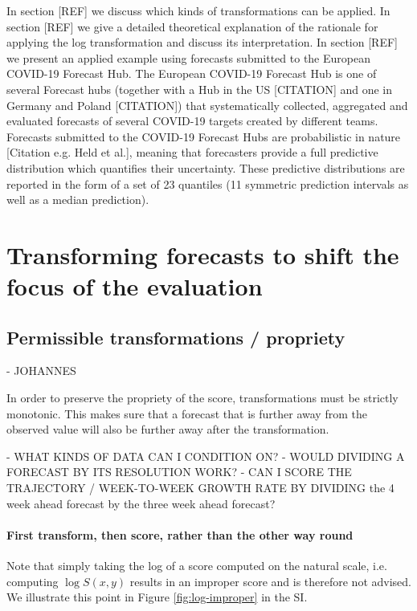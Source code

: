 \documentclass{article}
\begin{document}
In section [REF] we discuss which kinds of transformations can be applied. In section [REF] we give a detailed theoretical explanation of the rationale for applying the log transformation and discuss its interpretation. In section [REF] we present an applied example using forecasts submitted to the European COVID-19 Forecast Hub. The European COVID-19 Forecast Hub is one of several Forecast hubs (together with a Hub in the US [CITATION] and one in Germany and Poland [CITATION]) that systematically collected, aggregated and evaluated forecasts of several COVID-19 targets created by different teams. Forecasts submitted to the COVID-19 Forecast Hubs are probabilistic in nature [Citation e.g. Held et al.], meaning that forecasters provide a full predictive distribution which quantifies their uncertainty. These predictive distributions are reported in the form of a set of 23 quantiles (11 symmetric prediction intervals as well as a median prediction). 

\section{Transforming forecasts to shift the focus of the evaluation}

\subsection{Permissible transformations / propriety} - JOHANNES

In order to preserve the propriety of the score, transformations must be strictly monotonic. This makes sure that a forecast that is further away from the observed value will also be further away after the transformation. 

- WHAT KINDS OF DATA CAN I CONDITION ON? 
- WOULD DIVIDING A FORECAST BY ITS RESOLUTION WORK? 
- CAN I SCORE THE TRAJECTORY / WEEK-TO-WEEK GROWTH RATE BY DIVIDING the 4 week ahead forecast by the three week ahead forecast? 

\paragraph{First transform, then score, rather than the other way round}
Note that simply taking the log of a score computed on the natural scale, i.e. computing $\log S(x, y)$ results in an improper score and is therefore not advised. We illustrate this point in Figure \ref{fig:log-improper} in the SI. 
\end{document}
